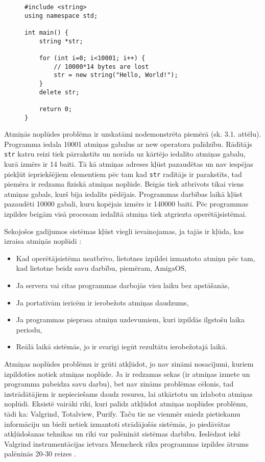 \begin{figure}[h]
\begin{lstlisting}
#include <string>
using namespace std;

int main() {
    string *str;

    for (int i=0; i<10001; i++) {
        // 10000*14 bytes are lost
        str = new string("Hello, World!");
    }
    delete str;

    return 0;
}
\end{lstlisting}
\caption{\textbf{\fontsize{11}{12}\selectfont {Atmiņas noplūde, C++}}}
\end{figure}

Atmiņās noplūdes problēma ir uzskatāmi nodemonstrēta piemērā (sk. 3.1. attēlu).
Programma  iedala 10001 atmiņas gabalus ar new operatora palīdzību. 
Rādītājs \texttt{str} katru reizi tiek pārrakstīts un norāda uz kārtējo iedalīto atmiņas gabalu, kurā izmērs ir 14 baiti.
Tā kā atmiņas adreses kļūst pazaudētas un nav iespējas piekļūt iepriekšējiem elementiem pēc tam kad  \texttt{str} radītājs ir parakstīts, tad piemēra ir redzama fiziskā atmiņas noplūde.
Beigās tiek atbrīvots tikai viens atmiņas gabals, kurš bija iedalīts pēdējais. 
Programmas darbības laikā kļūst pazaudēti 10000 gabali, kuru kopējais izmērs ir 140000 baiti.
 Pēc programmas izpildes beigām visā procesam iedalītā atmiņa tiek atgriezta operētājsistēmai.


Sekojošos gadījumos sistēmas kļūst viegli ievainojamas, ja tajās ir kļūda, kas izraisa atmiņās noplūdi \cite{RTTV}: 
\begin{itemize}
\item { Kad operētājsistēma neatbrīvo, lietotnes izpildei izmantoto atmiņu pēc tam, kad lietotne beidz savu darbību, piemēram, AmigaOS,}
\item { Ja servera vai citas programmas darbojās visu laiku bez apstāšanās, }
\item { Ja portatīvām ierīcēm ir ierobežots atmiņas daudzums, }
\item { Ja programmas pieprasa atmiņu uzdevumiem, kuri izpildās ilgstošu laika periodu, }
\item { Reālā laikā sistēmās, jo ir svarīgi iegūt rezultātu ierobežotajā laikā. }
\end{itemize}

Atmiņas noplūdes problēmu ir grūti atkļūdot,  jo nav zināmi nosacījumi, kuriem izpildoties notiek atmiņas noplūde. 
Ja ir redzamas sekas (ir atmiņas izmete un programma pabeidza savu darbu), bet nav zināms problēmas cēlonis, tad izstrādātājiem ir nepieciešams daudz resursu, lai atkārtotu un izlabotu atmiņas noplūdi. 
Eksistē vairāki rīki, kuri palīdz atkļūdot atmiņas noplūdes problēmu, tādi ka: Valgrind, Totalview, Purify. 
Taču tie ne vienmēr sniedz pietiekamu informāciju un bieži netiek izmantoti strādājošās sistēmās, jo piedāvātas atkļūdošanas tehnikas un rīki var palēnināt sistēmas darbību.
Ieslēdzot iekš Valgrind instrumentācijas ietvara Memcheck rīku programmas izpildes ātrums palēninās 20-30 reizes \cite{UVD}.



